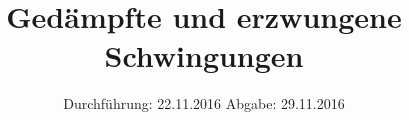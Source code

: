 

\subject{V354}
\title{Gedämpfte und erzwungene Schwingungen}
\date{
	Durchführung: 22.11.2016
	\hspace{4em}
	Abgabe: 29.11.2016
}


	\maketitle
	\newpage
	\tableofcontents
	\newpage
	
	
	
	
	
	
	\newpage
	
	\printbibliography

